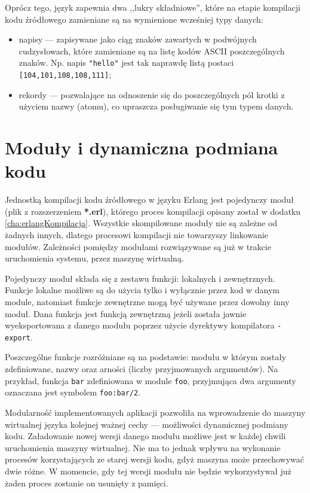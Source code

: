 Oprócz tego, język zapewnia dwa ,,lukry składniowe'', które na etapie kompilacji kodu źródłowego zamieniane są na wymienione wcześniej typy danych:
\begin{itemize}
\item napisy --- zapisywane jako ciąg znaków zawartych w podwójnych cudzysłowach, które zamieniane są na listę kodów ASCII poszczególnych znaków. Np. napis \texttt{"hello"} jest tak naprawdę listą postaci \texttt{[104,101,108,108,111]};
\item rekordy --- pozwalające na odnoszenie się do poszczególnych pól krotki z użyciem nazwy (atomu), co upraszcza posługiwanie się tym typem danych.
\end{itemize}

\section{Moduły i dynamiczna podmiana kodu}
\label{sec:erlangModuly}

Jednostką kompilacji kodu źródłowego w języku Erlang jest pojedynczy moduł (plik z rozszerzeniem \textbf{*.erl}), którego proces kompilacji opisany został w dodatku \ref{cha:erlangKompilacja}.
Wszystkie skompilowane moduły nie są zależne od żadnych innych, dlatego procesowi kompilacji nie towarzyszy linkowanie modułów.
Zależności pomiędzy modułami rozwiązywane są już w trakcie uruchomienia systemu, przez maszynę wirtualną. 

Pojedynczy moduł składa się z zestawu funkcji: lokalnych i zewnętrznych.
Funkcje lokalne możliwe są do użycia tylko i wyłącznie przez kod w danym module, natomiast funkcje zewnętrzne mogą być używane przez dowolny inny moduł.
Dana funkcja jest funkcją zewnętrzną jeżeli została jawnie wyeksportowana z danego modułu poprzez użycie dyrektywy kompilatora \texttt{-export}.

Poszczególne funkcje rozróżniane są na podstawie: modułu w którym zostały zdefiniowane, nazwy oraz arności (liczby przyjmowanych argumentów).
Na przykład, funkcja \texttt{bar} zdefiniowana w module \texttt{foo}, przyjmująca dwa argumenty oznaczana jest symbolem \texttt{foo:bar/2}.

Modularność implementowanych aplikacji pozwoliła na wprowadzenie do maszyny wirtualnej języka kolejnej ważnej cechy --- możliwości dynamicznej podmiany kodu.
Załadowanie nowej wersji danego modułu możliwe jest w każdej chwili uruchomienia maszyny wirtualnej.
Nie ma to jednak wpływu na wykonanie procesów korzystających ze starej wersji kodu, gdyż maszyna może przechowywać dwie różne.
W momencie, gdy tej wersji modułu nie będzie wykorzystywał już żaden proces zostanie on usunięty z pamięci.

